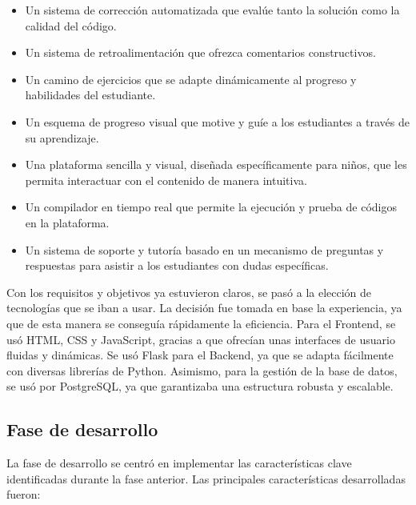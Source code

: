 \begin{itemize}
    \item Un sistema de corrección automatizada que evalúe tanto la solución como la calidad del código.
    \item Un sistema de retroalimentación que ofrezca comentarios constructivos.
    \item Un camino de ejercicios que se adapte dinámicamente al progreso y habilidades del estudiante.
    \item Un esquema de progreso visual que motive y guíe a los estudiantes a través de su aprendizaje.
    \item Una plataforma sencilla y visual, diseñada específicamente para niños, que les permita interactuar con el contenido de manera intuitiva.
    \item Un compilador en tiempo real que permite la ejecución y prueba de códigos en la plataforma.
    \item Un sistema de soporte y tutoría basado en un mecanismo de preguntas y respuestas para asistir a los estudiantes con dudas específicas.
\end{itemize}

Con los requisitos y objetivos ya estuvieron claros, se pasó a la elección de tecnologías que se iban a usar. La decisión fue tomada en base la experiencia, ya que de esta manera se conseguía rápidamente la eficiencia. Para el Frontend, se usó HTML, CSS y JavaScript, gracias a que ofrecían unas interfaces de usuario fluidas y dinámicas. Se usó Flask para el Backend, ya que se adapta fácilmente con diversas librerías de Python. Asimismo, para la gestión de la base de datos, se usó por PostgreSQL, ya que garantizaba una estructura robusta y escalable.

\subsection {Fase de desarrollo}

La fase de desarrollo se centró en implementar las características clave identificadas durante la fase anterior. Las principales características desarrolladas fueron:

